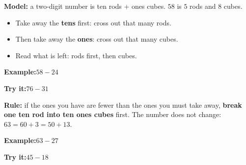 \documentclass[12pt]{article}
\begin{document}


\begin{formulabox}
\textbf{Model:} a two-digit number is ten rods $+$ ones cubes. $58$ is $5$ rods and $8$ cubes.
\begin{itemize}[leftmargin=1cm, itemsep=1pt, topsep=2pt]
  \item Take away the \textbf{tens} first: cross out that many rods.
  \item Then take away the \textbf{ones}: cross out that many cubes.
  \item Read what is left: rods first, then cubes.
\end{itemize}
\end{formulabox}

\begin{examplebox}
\textbf{Example:}\quad $58 - 24$
\end{examplebox}

\begin{tryitbox}
\textbf{Try it:}\quad $76 - 31$\\[2pt]
\end{tryitbox}


\begin{formulabox}
\textbf{Rule:} if the ones you have are fewer than the ones you must take away,
\textbf{break one ten rod into ten ones cubes} first. The number does not change:
$63 = 60 + 3 = 50 + 13$.
\end{formulabox}

\begin{examplebox}
\textbf{Example:}\quad $63 - 27$
\end{examplebox}

\begin{tryitbox}
\textbf{Try it:}\quad $45 - 18$\\[2pt]
\end{tryitbox}
\end{document}
